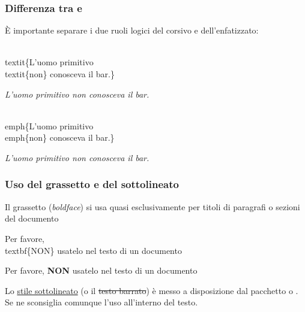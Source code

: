 \documentclass[svgnames,%
	ucs,%
	pdftex]{guitbeamer}
\begin{document}
\begin{frame}
  \frametitle{Differenza tra  e }
	\`E importante separare i due ruoli logici del corsivo e dell'enfatizzato:
	\begin{LaTeXcode}
		\alert{\\textit\{}L'uomo primitivo \alert{\\textit\{}non\alert{\}}
		conosceva il bar.\alert{\}}
	\end{LaTeXcode}
	\begin{LaTeXoutput}
		\textit{L'uomo primitivo \textit{non} conosceva il bar.}
	\end{LaTeXoutput}
	\begin{LaTeXcode}
		\alert{\\emph\{}L'uomo primitivo \alert{\\emph\{}non\alert{\}}
		conosceva il bar.\alert{\}}
	\end{LaTeXcode}
	\begin{LaTeXoutput}
		\emph{L'uomo primitivo \textup{non} conosceva il bar.}
	\end{LaTeXoutput}
\end{frame}
\begin{frame}
  \frametitle{Uso del grassetto e del sottolineato}
	Il grassetto (\textit{boldface}) si usa quasi esclusivamente per
	titoli di paragrafi o sezioni del documento
	\begin{LaTeXcode}
		Per favore, \alert{\\textbf\{}NON\alert{\}} usatelo nel testo di un documento
	\end{LaTeXcode}
	\begin{LaTeXoutput}
		Per favore, \textbf{NON} usatelo nel testo di un documento
	\end{LaTeXoutput}
  \medskip
	Lo \ul{stile sottolineato} (o il \st{testo barrato}) \`e messo a disposizione dal pacchetto  o . Se ne sconsiglia comunque l'uso all'interno del testo.
\end{frame}
\end{document}
